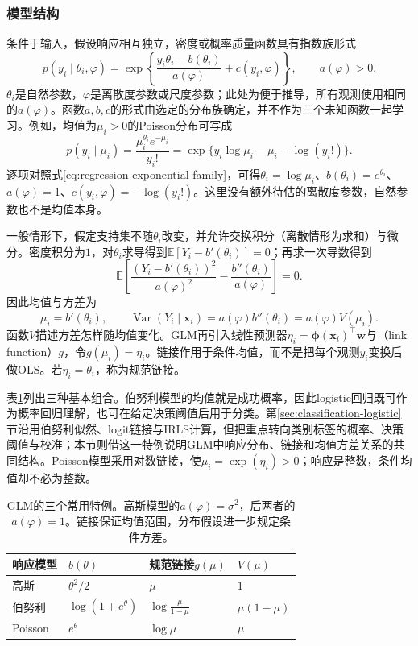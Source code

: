 \subsubsection{模型结构}

条件于输入，假设响应相互独立，密度或概率质量函数具有指数族形式
\begin{equation}
  p(y_i\mid\theta_i,\varphi)
  =\exp\!\left\{
    \frac{y_i\theta_i-b(\theta_i)}{a(\varphi)}
    +c(y_i,\varphi)\right\},\qquad a(\varphi)>0.
  \label{eq:regression-exponential-family}
\end{equation}
$\theta_i$是自然参数，$\varphi$是离散度参数或尺度参数；此处为便于推导，所有观测使用相同的$a(\varphi)$。函数$a,b,c$的形式由选定的分布族确定，并不作为三个未知函数一起学习。例如，均值为$\mu_i>0$的Poisson分布可写成
\[
  p(y_i\mid\mu_i)
  =\frac{\mu_i^{y_i}e^{-\mu_i}}{y_i!}
  =\exp\{y_i\log\mu_i-\mu_i-\log(y_i!)\}.
\]
逐项对照式\eqref{eq:regression-exponential-family}，可得$\theta_i=\log\mu_i$、$b(\theta_i)=e^{\theta_i}$、$a(\varphi)=1$、$c(y_i,\varphi)=-\log(y_i!)$。这里没有额外待估的离散度参数，自然参数也不是均值本身。

一般情形下，假定支持集不随$\theta_i$改变，并允许交换积分（离散情形为求和）与微分。密度积分为$1$，对$\theta_i$求导得到$\mathbb{E}[Y_i-b'(\theta_i)]=0$；再求一次导数得到
\[
  \mathbb{E}\!\left[
    \frac{(Y_i-b'(\theta_i))^2}{a(\varphi)^2}
      -\frac{b''(\theta_i)}{a(\varphi)}\right]=0.
\]
因此均值与方差为
\begin{equation}
  \mu_i=b'(\theta_i),\qquad
  \operatorname{Var}(Y_i\mid\bm{x}_i)
  =a(\varphi)b''(\theta_i)=a(\varphi)V(\mu_i).
  \label{eq:regression-glm-moments}
\end{equation}
函数$V$描述方差怎样随均值变化。GLM再引入线性预测器$\eta_i=\bm{\phi}(\bm{x}_i)^{\top}\bm{w}$与（link function）$g$，令$g(\mu_i)=\eta_i$。链接作用于条件均值，而不是把每个观测$y_i$变换后做OLS。若$\eta_i=\theta_i$，称为规范链接。

表\ref{tab:regression-glm}列出三种基本组合。伯努利模型的均值就是成功概率，因此logistic回归既可作为概率回归理解，也可在给定决策阈值后用于分类。第\ref{sec:classification-logistic}节沿用伯努利似然、logit链接与IRLS计算，但把重点转向类别标签的概率、决策阈值与校准；本节则借这一特例说明GLM中响应分布、链接和均值方差关系的共同结构。Poisson模型采用对数链接，使$\mu_i=\exp(\eta_i)>0$；响应是整数，条件均值却不必为整数。

\begin{table}[htbp]
  \centering
  \begin{tabular}{llll}
    \toprule
    响应模型 & $b(\theta)$ & 规范链接$g(\mu)$ & $V(\mu)$\\
    \midrule
    高斯 & $\theta^2/2$ & $\mu$ & $1$\\
    伯努利 & $\log(1+e^\theta)$ & $\log\frac{\mu}{1-\mu}$ & $\mu(1-\mu)$\\
    Poisson & $e^\theta$ & $\log\mu$ & $\mu$\\
    \bottomrule
  \end{tabular}
  \caption{GLM的三个常用特例。高斯模型的$a(\varphi)=\sigma^2$，后两者的$a(\varphi)=1$。链接保证均值范围，分布假设进一步规定条件方差。}
  \label{tab:regression-glm}
\end{table}

